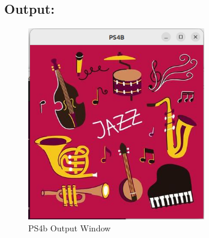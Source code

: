 \subsection{Output:}
\begin{figure}[h]
   \centering
    \includegraphics[width=0.69\textwidth]{ps4b/ps4b.png}
    \caption{PS4b Output Window}
    \label{fig:ps4b}
\end{figure}


\newpage
